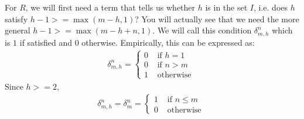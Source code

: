 		For $R$, we will first need a term that tells us whether $h$ is in the set $I$, i.e. does $h$ satisfy $h-1>=\max(m-h, 1)$? You will actually see that we need the more general $h-1>=\max(m-h+n, 1)$. We will call this condition $\delta_{m, h}^n$ which is $1$ if satisfied and $0$ otherwise. Empirically, this can be expressed as:
		\begin{align}
			\delta_{m, h}^n = \begin{cases}
				0 & \text{ if } h = 1 \\
				0 & \text{ if } n > m \\
				1 & \text{ otherwise }
			\end{cases}
		\end{align}
		Since $h >=2$,
		\begin{align}
			\delta_{m, h}^n = \delta_m^n = \begin{cases}
				1 & \text{ if } n \le m\\
				0 & \text{ otherwise }
			\end{cases}
		\end{align}

